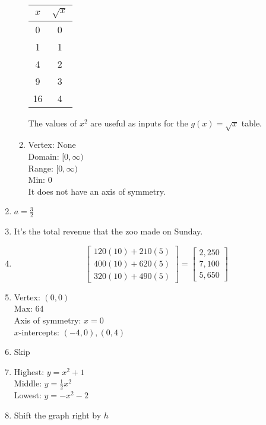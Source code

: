 \documentclass{article}
\begin{document}
\begin{enumerate}
\begin{enumerate}
		\begin{tabular}{c | c}
		$x$ & $\sqrt{x}$ \\
		\hline
		0 & 0 \\
		1 & 1 \\
		4 & 2 \\
		9 & 3 \\
		16 & 4
		\end{tabular}
	
		The values of $x^2$ are useful as inputs for the $g(x) = \sqrt{x}$ table.
	
	\item Vertex: None \\
		Domain: $[0, \infty)$ \\
		Range: $[0, \infty)$ \\
		Min: 0 \\
		It does not have an axis of symmetry.
	
	\end{enumerate}
	
\item $a = \frac{3}{2}$

\item It's the total revenue that the zoo made on Sunday.

\item 
	\begin{equation*}
	\begin{bmatrix}
	120(10) + 210(5) \\
	400(10) + 620(5) \\
	320(10) + 490(5)
	\end{bmatrix} =
	\begin{bmatrix}
	2,250 \\
	7,100 \\
	5,650
	\end{bmatrix}
	\end{equation*}
	
\item Vertex: $(0,0)$ \\
	Max: 64 \\
	Axis of symmetry: $x = 0$ \\
	$x$-intercepts: $(-4,0), (0,4)$ \\
	
\item Skip

\item Highest: $y = x^2 + 1$ \\
	Middle: $y = \frac{1}{2}x^2$ \\
	Lowest: $y = -x^2 - 2$
	
\item Shift the graph right by $h$
	
\end{enumerate}
\end{document}
